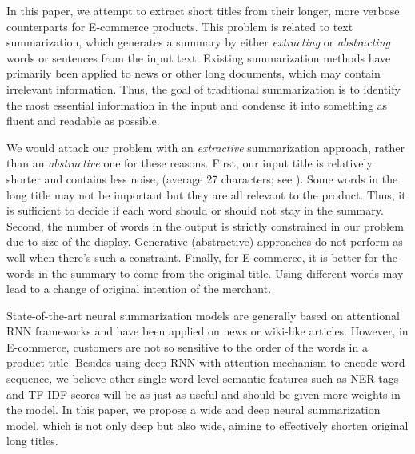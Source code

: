 In this paper, we attempt to extract short titles from 
their longer, more verbose counterparts for E-commerce products.
This problem is related to text summarization, 
which generates a summary by either {\em extracting} or {\em abstracting}
words or sentences from the input text. 
Existing summarization methods have primarily been applied to news or 
other long documents, which may contain irrelevant information. 
Thus, the goal of traditional summarization is to identify
the most essential information in the input and condense
it into something as fluent and readable as possible. 

We would attack our problem with an \textit{extractive} summarization 
approach, rather than an {\em abstractive} one for these reasons.
First, our input title is relatively shorter and contains less noise,
(average 27 characters; see ).
Some words in the long title may not be important but they are all relevant 
to the product. Thus, it is sufficient to decide if each word should or 
should not stay in the summary. 
Second, the number of words in the output is strictly constrained in 
our problem due to size of the display. 
Generative (abstractive) approaches do not perform as well when there's
such a constraint.
Finally, for E-commerce, it is better for the words in the summary to come 
from the original title. 
Using different words may lead to a change of original intention of
the merchant.

State-of-the-art neural summarization models
\cite{cheng2016neural,narayan2017neural}
are generally based on attentional RNN frameworks and have been applied
on news or wiki-like articles.
However, in E-commerce, 
customers are not so sensitive to the order of the words in a product title. 
Besides using deep RNN with attention mechanism to encode word sequence, 
we believe other single-word level semantic features such as NER tags and 
TF-IDF scores
will be as just as useful and should be given more weights in the model.
In this paper, we propose a wide and deep neural summarization model, 
which is not only deep but also wide, 
aiming to effectively shorten original long titles.

